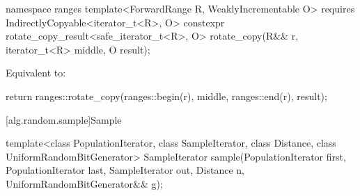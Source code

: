 \begin{itemdecl}
namespace ranges {
  template<ForwardRange R, WeaklyIncrementable O>
    requires IndirectlyCopyable<iterator_t<R>, O>
    constexpr rotate_copy_result<safe_iterator_t<R>, O>
      rotate_copy(R&& r, iterator_t<R> middle, O result);
}
\end{itemdecl}

\begin{itemdescr}
\pnum
\effects
Equivalent to:
\begin{codeblock}
return ranges::rotate_copy(ranges::begin(r), middle, ranges::end(r), result);
\end{codeblock}
\end{itemdescr}

[alg.random.sample]{Sample}

%
\begin{itemdecl}
template<class PopulationIterator, class SampleIterator,
         class Distance, class UniformRandomBitGenerator>
  SampleIterator sample(PopulationIterator first, PopulationIterator last,
                        SampleIterator out, Distance n,
                        UniformRandomBitGenerator&& g);
\end{itemdecl}

